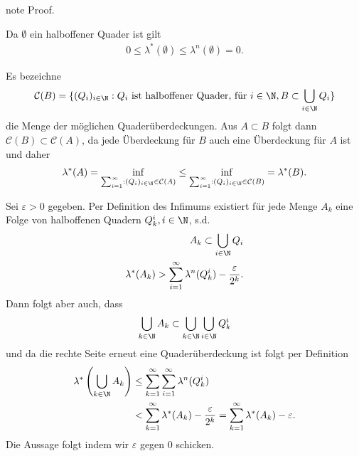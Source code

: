 \documentclass[letterpaper,10pt,german]{jupyterBook}
\begin{document}
\begin{sphinxadmonition}{note}
\sphinxAtStartPar
Proof. 

\sphinxAtStartPar
Da \(\emptyset\) ein halboffener Quader ist gilt
\begin{equation*}
\begin{split}0\leq \lambda^\ast(\emptyset) \leq \lambda^n(\emptyset) = 0.\end{split}
\end{equation*}
\sphinxAtStartPar
{}

\sphinxAtStartPar
Es bezeichne
\begin{equation*}
\begin{split}\mathcal{C}(B) = \{ (Q_i)_{i\in\N}: Q_i \text{ ist halboffener Quader, für }i\in\N, B\subset \bigcup_{i\in\N} Q_i  \}\end{split}
\end{equation*}
\sphinxAtStartPar
die Menge der möglichen Quaderüberdeckungen. Aus \(A\subset B\) folgt dann \(\mathcal{C}(B) \subset \mathcal{C}(A)\), da jede Überdeckung für \(B\) auch eine Überdeckung für \(A\) ist und daher
\begin{equation*}
\begin{split}\lambda^\ast(A) = \inf_{\sum_{i=1}^\infty:(Q_i)_{i\in\N}\in \mathcal{C}(A)} \leq 
\inf_{\sum_{i=1}^\infty:(Q_i)_{i\in\N}\in \mathcal{C}(B)} = \lambda^\ast(B).\end{split}
\end{equation*}
\sphinxAtStartPar
{}

\sphinxAtStartPar
Sei \(\varepsilon>0\) gegeben. Per Definition des Infimums existiert für jede Menge \(A_k\) eine Folge von halboffenen Quadern \(Q_k^i, i\in\N\), s.d.
\begin{equation*}
\begin{split}A_k \subset \bigcup_{i\in\N} Q_i\\
\lambda^\ast(A_k) > \sum_{i=1}^\infty \lambda^n(Q_k^i) - \frac{\varepsilon}{2^k}.\end{split}
\end{equation*}
\sphinxAtStartPar
Dann folgt aber auch, dass
\begin{equation*}
\begin{split}\bigcup_{k\in\N} A_k \subset \bigcup_{k\in\N}\bigcup_{i\in\N} Q_k^i\end{split}
\end{equation*}
\sphinxAtStartPar
und da die rechte Seite erneut eine Quaderüberdeckung ist folgt per Definition
\begin{equation*}
\begin{split}\lambda^\ast\left(\bigcup_{k\in\N} A_k\right) 
&\leq \sum_{k=1}^\infty\sum_{i=1}^\infty \lambda^n(Q_k^i)\\
&<
\sum_{k=1}^\infty \lambda^\ast(A_k) - \frac{\varepsilon}{2^k} =
\sum_{k=1}^\infty \lambda^\ast(A_k) - \varepsilon.\end{split}
\end{equation*}
\sphinxAtStartPar
Die Aussage folgt indem wir \(\varepsilon\) gegen 0 schicken.


\end{sphinxadmonition}
\end{document}
